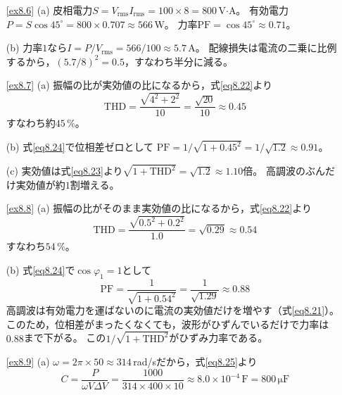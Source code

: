 \begin{enumerate}
(b) 式\ref{eq8.11}の$C$は周波数$f$に反比例する。
商用周波数の$50$\,HzはDC-DCコンバータのスイッチング周波数（数十kHz以上）より3桁ほど低く，
放電期間が長いぶん多くの電荷を蓄えておかなければならないので，
同じリプルに抑えるには桁違いに大きな容量が必要になる。

\item[\ref{ex8.6}]
(a) 皮相電力$S = V_{\mathrm{rms}} I_{\mathrm{rms}} = 100\times8 = 800$\,V$\cdot$A。
有効電力$P = S\cos45^\circ = 800\times0.707 \approx 566$\,W。
力率$\mathrm{PF} = \cos45^\circ \approx 0.71$。

(b) 力率$1$なら$I = P/V_{\mathrm{rms}} = 566/100 \approx 5.7$\,A。
配線損失は電流の二乗に比例するから，$(5.7/8)^2 = 0.5$，すなわち半分に減る。

\item[\ref{ex8.7}]
(a) 振幅の比が実効値の比になるから，式\ref{eq8.22}より
\begin{equation*}
\mathrm{THD} = \frac{\sqrt{4^2 + 2^2}}{10} = \frac{\sqrt{20}}{10} \approx 0.45
\end{equation*}
すなわち約$45\,\%$。

(b) 式\ref{eq8.24}で位相差ゼロとして
$\mathrm{PF} = 1/\sqrt{1 + 0.45^2} = 1/\sqrt{1.2} \approx 0.91$。

(c) 実効値は式\ref{eq8.23}より$\sqrt{1 + \mathrm{THD}^2} = \sqrt{1.2} \approx 1.10$倍。
高調波のぶんだけ実効値が約$1$割増える。

\item[\ref{ex8.8}]
(a) 振幅の比がそのまま実効値の比になるから，式\ref{eq8.22}より
\begin{equation*}
\mathrm{THD} = \frac{\sqrt{0.5^2 + 0.2^2}}{1.0} = \sqrt{0.29} \approx 0.54
\end{equation*}
すなわち$54\,\%$。

(b) 式\ref{eq8.24}で$\cos\varphi_1 = 1$として
\begin{equation*}
\mathrm{PF} = \frac{1}{\sqrt{1 + 0.54^2}} = \frac{1}{\sqrt{1.29}} \approx 0.88
\end{equation*}
高調波は有効電力を運ばないのに電流の実効値だけを増やす（式\ref{eq8.21}）。
このため，位相差がまったくなくても，波形がひずんでいるだけで力率は$0.88$まで下がる。
この$1/\sqrt{1+\mathrm{THD}^2}$がひずみ力率である。

\item[\ref{ex8.9}]
(a) $\omega = 2\pi\times50 \approx 314$\,rad/sだから，式\ref{eq8.25}より
\begin{equation*}
C = \frac{P}{\omega V\mathit{\Delta}V} = \frac{1000}{314\times400\times10} \approx 8.0\times10^{-4}\,\mathrm{F} = 800\,\mathrm{\mu F}
\end{equation*}


\end{enumerate}
